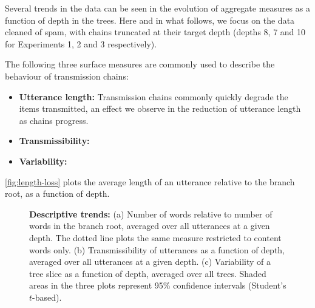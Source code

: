 \documentclass[a4paper,fleqn]{cas-dc}
\begin{document}
Several trends in the data can be seen in the evolution of aggregate measures as a function of depth in the trees. Here and in what follows, we focus on the data cleaned of spam, with chains truncated at their target depth (depths 8, 7 and 10 for Experiments 1, 2 and 3 respectively).

The following three surface measures are commonly used to describe the behaviour of transmission chains:

\begin{itemize}
	\item \textbf{Utterance length:}
	Transmission chains commonly quickly degrade the items transmitted, an effect we observe in the reduction of utterance length as chains progress.

	\item \textbf{Transmissibility:}


	\item \textbf{Variability:}


\end{itemize}

\cref{fig:length-loss} plots the average length of an utterance relative to the branch root, as a function of depth.



\begin{figure}
  \centering
  \caption{
  \textbf{Descriptive trends:}
  (a) Number of words relative to number of words in the branch root, averaged over all utterances at a given depth. The dotted line plots the same measure restricted to content words only.
  (b) Transmissibility of utterances as a function of depth, averaged over all utterances at a given depth.
  (c) Variability of a tree slice as a function of depth, averaged over all trees.
  Shaded areas in the three plots represent 95\% confidence intervals (Student's $t$-based).
  }
  \label{fig:general-trends}
\end{figure}
\end{document}
